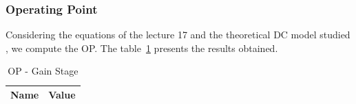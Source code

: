 \subsubsection{Operating Point}
Considering the equations of the lecture 17 and the theoretical DC model studied , we compute the OP. The table~\ref{tab:opgs} presents the results obtained.

\begin{table}[H]
  \centering
  \begin{tabular}{|l|r|}
     \hline    
    {\bf Name} & {\bf Value} \\ \hline   
    
  \end{tabular}
  \caption{OP - Gain Stage}
  \label{tab:opgs}
\end{table}


